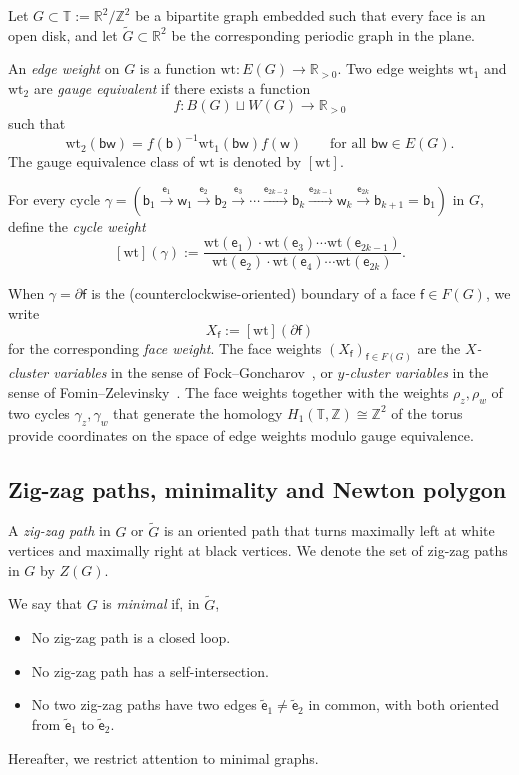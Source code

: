 \documentclass[12pt]{amsart}
\numberwithin{equation}{section}
\theoremstyle{definition}
\newcommand{\Z}{\mathbb{Z}}
\newcommand{\R}{\mathbb{R}}
\def\G{\tilde{G}}
\def\Gtor{G}
\def\blackvertices{B}
\def\whitevertices{W}
\def\faces{F}
\def\edges{E}
\newcommand{\wt}{\mathrm{wt}}
\def\Rpos{\R_{>0}}
\def\bw{\mathsf{w}}
\def\bb{\mathsf{b}}
\def\be{{\mathsf{e}}}
\def\bface{\mathsf{f}}
\def\torus{\mathbb{T}}
\def\zzG{{{Z}(G)}}
\begin{document}
Let $\Gtor \subset \torus:=\R^2/\Z^2$ be a bipartite graph embedded such that every face is an open disk, and let $\G \subset \R^2$ be the corresponding periodic graph in the plane. 

An \emph{edge weight} on $\Gtor$ is a function $\wt:\edges(\Gtor) \to \Rpos$.  
Two edge weights $\wt_1$ and $\wt_2$ are \emph{gauge equivalent} if there exists a function 
\[
f:\blackvertices(\Gtor) \sqcup \whitevertices(\Gtor) \rightarrow \Rpos
\]
such that
\[
\wt_2(\bb \bw) = f(\bb)^{-1} \wt_1(\bb \bw) f(\bw) \qquad \text{for all $\bb \bw \in \edges(\Gtor)$}.
\]
The gauge equivalence class of $\wt$ is denoted by $[\wt]$.

For every cycle 
$\gamma = (\bb_1 \xrightarrow{\be_1} \bw_1 \xrightarrow{\be_2} \bb_2 \xrightarrow{\be_3} \cdots \xrightarrow{\be_{2k-2}} \bb_k \xrightarrow{\be_{2k-1}} \bw_k \xrightarrow{\be_{2k}} \bb_{k+1}=\bb_1)$ in $\Gtor$, define the \emph{cycle weight}
\begin{equation}\label{eq:wt_L_dfn}
[\wt](\gamma) := 
\frac{\wt(\be_1)\cdot \wt(\be_3)\cdots \wt(\be_{2k-1})}{\wt(\be_2)\cdot\wt(\be_4) \cdots \wt(\be_{2k})}.
\end{equation}

When $\gamma = \partial \bface$ is the (counterclockwise-oriented) boundary of a face $\bface \in \faces(\Gtor)$, we write
\[
X_{\bface}:= [\wt](\partial \bface)
\]
for the corresponding \emph{face weight}. The face weights $(X_{\bface})_{\bface \in \faces(\Gtor)}$ are the \emph{$X$-cluster variables} in the sense of Fock--Goncharov~\cite{FoGo_cluster}, or \emph{$y$-cluster variables} in the sense of Fomin--Zelevinsky~\cite{FZ}. The face weights together with the weights $\rho_z,\rho_w$ of two cycles $\gamma_z, \gamma_w$ that generate the homology $H_1(\torus,\Z) \cong \Z^2$ of the torus provide coordinates on the space of edge weights modulo gauge equivalence.

\subsection{Zig-zag paths, minimality and Newton polygon} \label{sec:NewtonPolygon}

A \emph{zig-zag path} in $\Gtor$ or $\G$ is an oriented path that turns maximally left at white vertices and maximally right at black vertices. We denote the set of zig-zag paths in $\Gtor$ by $\zzG$.

We say that $\Gtor$ is \emph{minimal} if, in $\G$,
\begin{itemize}
\item No zig-zag path is a closed loop.
\item No zig-zag path has a self-intersection.
\item No two zig-zag paths have two edges $\tilde \be_1 \neq \tilde \be_2$ in common, with both oriented from $\tilde \be_1$ to $\tilde \be_2$.
\end{itemize}
Hereafter, we restrict attention to minimal graphs.  
\end{document}
